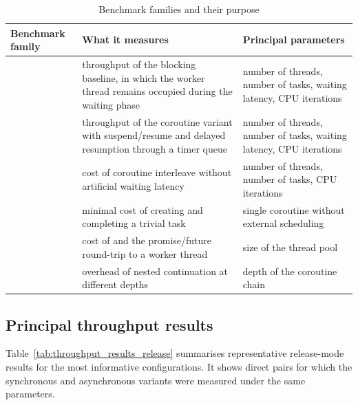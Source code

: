 \begin{table}[H]
\centering
\small
\caption{Benchmark families and their purpose}
\label{tab:benchmark_families}
\begin{tabularx}{\textwidth}{L{3.4cm}L{5.2cm}Y}
\toprule
\textbf{Benchmark family} & \textbf{What it measures} & \textbf{Principal parameters} \\
\midrule
{} & throughput of the blocking baseline, in which the worker thread remains occupied during the waiting phase & number of threads, number of tasks, waiting latency, CPU iterations \\
 & throughput of the coroutine variant with suspend/resume and delayed resumption through a timer queue & number of threads, number of tasks, waiting latency, CPU iterations \\
 & cost of coroutine interleave without artificial waiting latency & number of threads, number of tasks, CPU iterations \\
 & minimal cost of creating and completing a trivial task & single coroutine without external scheduling \\
 & cost of  and the promise/future round-trip to a worker thread & size of the thread pool \\
 & overhead of nested  continuation at different depths & depth of the coroutine chain \\
\bottomrule
\end{tabularx}
\end{table}

\subsection{Principal throughput results}

Table~\ref{tab:throughput_results_release} summarises representative release-mode results for the most informative configurations. It shows direct pairs for which the synchronous and asynchronous variants were measured under the same parameters.

